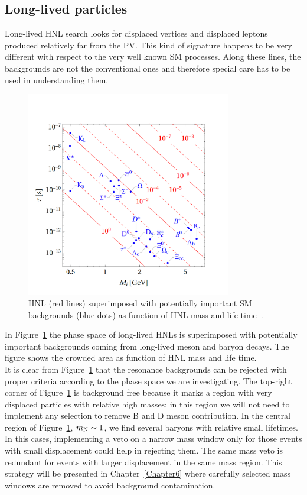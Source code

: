 \subsection{Long-lived particles}\label{sec:c4LLbgk}
Long-lived HNL search looks for displaced
vertices and displaced leptons produced relatively far from the PV.
This kind of signature happens to be very different with respect to the
very well known SM processes. Along these lines, the backgrounds
are not the conventional ones and
therefore special care has to be used in understanding them.
\begin{figure}[h!]
\centering
 \includegraphics[clip,trim=0.5cm 0.5cm 2cm 2cm, width=0.80\textwidth]{Figures/c4/resonances.pdf}
  \caption{HNL \mixpar (red lines) superimposed with potentially important SM backgrounds
(blue dots) as function of HNL mass and life time~\cite{Drewes_2020_jan}.}
  \label{fig:c4LLbgk}
\end{figure}


In Figure~\ref{fig:c4LLbgk} the phase space of long-lived HNLs is
superimposed with potentially important backgrounds coming from
long-lived meson and baryon decays. The figure shows the crowded area as function
of HNL mass and life time.\\
It is clear from Figure~\ref{fig:c4LLbgk} that the resonance
backgrounds can be rejected with proper criteria according to
the phase space we are investigating.
The top-right corner of Figure~\ref{fig:c4LLbgk} is
background free because it marks a region with very displaced particles
with relative high masses; in this region we will not need to implement
any selection to remove B and D meson contribution. In the central
region of Figure~\ref{fig:c4LLbgk}, $m_\mathrm{N} \sim 1$\GeV, we find several
baryons with relative small lifetimes. In this cases, implementing a 
veto on a narrow mass window only for those events with small
displacement could help in rejecting them. The same mass veto is redundant
for events with larger displacement in the same mass region.
This strategy will be presented in
Chapter~\ref{Chapter6} where carefully selected mass windows are removed
to avoid background contamination.




